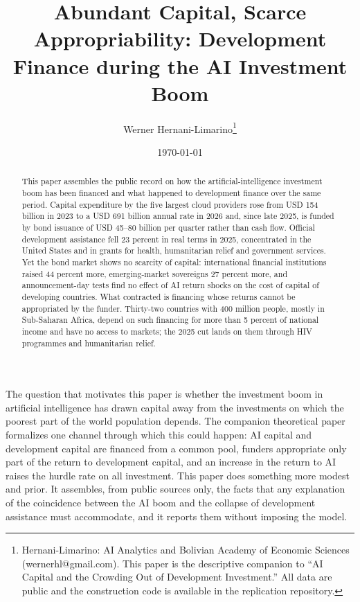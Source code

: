 \documentclass[AER]{AEA}
\begin{document}
\title{Abundant Capital, Scarce Appropriability: Development Finance during the AI Investment Boom}
\author{Werner Hernani-Limarino\thanks{Hernani-Limarino: AI Analytics and Bolivian Academy of Economic Sciences (wernerhl@gmail.com). This paper is the descriptive companion to ``AI Capital and the Crowding Out of Development Investment.'' All data are public and the construction code is available in the replication repository.}}
\date{\today}

\begin{abstract}
This paper assembles the public record on how the artificial-intelligence investment boom has been financed and what happened to development finance over the same period. Capital expenditure by the five largest cloud providers rose from USD 154 billion in 2023 to a USD 691 billion annual rate in 2026 and, since late 2025, is funded by bond issuance of USD 45--80 billion per quarter rather than cash flow. Official development assistance fell 23 percent in real terms in 2025, concentrated in the United States and in grants for health, humanitarian relief and government services. Yet the bond market shows no scarcity of capital: international financial institutions raised 44 percent more, emerging-market sovereigns 27 percent more, and announcement-day tests find no effect of AI return shocks on the cost of capital of developing countries. What contracted is financing whose returns cannot be appropriated by the funder. Thirty-two countries with 400 million people, mostly in Sub-Saharan Africa, depend on such financing for more than 5 percent of national income and have no access to markets; the 2025 cut lands on them through HIV programmes and humanitarian relief.
\end{abstract}

\maketitle

The question that motivates this paper is whether the investment boom in artificial intelligence has drawn capital away from the investments on which the poorest part of the world population depends. The companion theoretical paper formalizes one channel through which this could happen: AI capital and development capital are financed from a common pool, funders appropriate only part of the return to development capital, and an increase in the return to AI raises the hurdle rate on all investment. This paper does something more modest and prior. It assembles, from public sources only, the facts that any explanation of the coincidence between the AI boom and the collapse of development assistance must accommodate, and it reports them without imposing the model.
\end{document}
